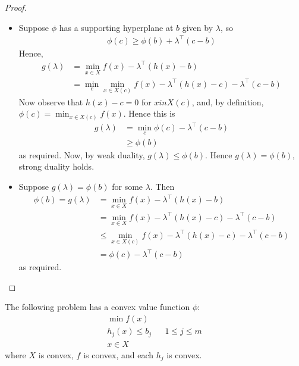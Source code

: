 \documentclass{../template/note}
\begin{document}
    \begin{proof}
        \begin{itemize}
            \item[$\impliedby$] Suppose $\phi$ has a supporting hyperplane at $b$ given by $\lambda$, so
            \begin{align*}
                \phi(c) \geq \phi(b) + \lambda^\intercal (c-b)
            \end{align*}
            Hence,
            \begin{align*}
                g(\lambda) &= \min_{x \in X} f(x) - \lambda^\intercal (h(x)-b) \\
                &= \min_c \min_{x \in X(c)} f(x) - \lambda^\intercal (h(x)-c) - \lambda^\intercal (c-b)
            \end{align*}
            Now observe that $h(x)-c = 0$ for $x in X(c)$, and, by definition, $\phi(c) = \min_{x \in X(c)} f(x)$. Hence this is
            \begin{align*}
                g(\lambda) &= \min_{c} \phi(c) - \lambda^\intercal (c-b) \\
                &\geq \phi(b)
            \end{align*}
            as required. Now, by weak duality, $g(\lambda) \leq \phi(b)$. Hence $g(\lambda) = \phi(b)$, strong duality holds.
            \item[$\implies$] Suppose $g(\lambda) = \phi(b)$ for some $\lambda$. Then
            \begin{align*}
                \phi(b) = g(\lambda) &= \min_{x \in X} f(x) - \lambda^\intercal (h(x)-b) \\
                &= \min_{x \in X} f(x) - \lambda^\intercal (h(x)-c) - \lambda^\intercal (c-b) \\
                &\leq \min_{x \in X(c)} f(x) - \lambda^\intercal (h(x)-c) - \lambda^\intercal (c-b) \\
                &= \phi(c) - \lambda^\intercal (c-b)
            \end{align*}
            as required.          
        \end{itemize}
    \end{proof}  
    
    \begin{theorem}
        The following problem has a convex value function $\phi$:
        \begin{align*}
            \min f(x) \\
            h_j(x) \leq b_j && 1 \leq j \leq m \\
            x \in X
        \end{align*}
        where $X$ is convex, $f$ is convex, and each $h_j$ is convex.        
    \end{theorem}
    
\end{document}
